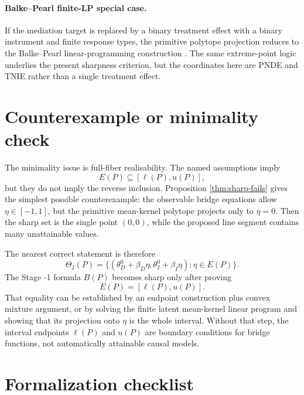 \documentclass[11pt]{article}
\theoremstyle{definition}
\theoremstyle{plain}
\theoremstyle{remark}
\begin{document}
\paragraph{Balke--Pearl finite-LP special case.}
If the mediation target is replaced by a binary treatment effect with a binary
instrument and finite response types, the primitive polytope projection reduces
to the Balke--Pearl linear-programming construction \cite{BalkePearl1997}.  The
same extreme-point logic underlies the present sharpness criterion, but the
coordinates here are PNDE and TNIE rather than a single treatment effect.

\section{Counterexample or minimality check}
The minimality issue is full-fiber realisability.  The named assumptions imply
\[
  E(P)\subseteq[\ell(P),u(P)],
\]
but they do not imply the reverse inclusion.  Proposition
\ref{thm:sharp-fails} gives the simplest possible counterexample: the
observable bridge equations allow \(\eta\in[-1,1]\), but the primitive
mean-kernel polytope projects only to \(\eta=0\).  Then the sharp set is the
single point \((0,0)\), while the proposed line segment contains many
unattainable values.

The nearest correct statement is therefore
\[
  \Theta_I(P)=
  \{(\theta_D^0+\beta_D\eta,\theta_I^0+\beta_I\eta):\eta\in E(P)\}.
\]
The Stage -1 formula \(B(P)\) becomes sharp only after proving
\[
  E(P)=[\ell(P),u(P)].
\]
That equality can be established by an endpoint construction plus convex
mixture argument, or by solving the finite latent mean-kernel linear program and
showing that its projection onto \(\eta\) is the whole interval.  Without that
step, the interval endpoints \(\ell(P)\) and \(u(P)\) are boundary conditions
for bridge functions, not automatically attainable causal models.

\section{Formalization checklist}
\end{document}
